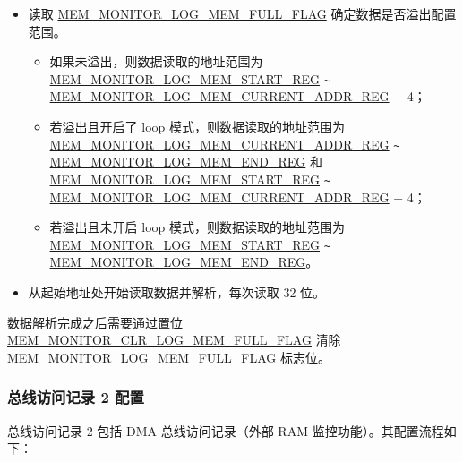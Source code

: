 \documentclass[main\_\_CN.tex]{subfiles}
\begin{document}
\begin{itemize}
    \item 读取 \hyperref[fielddesc:MEMMONITORLOGMEMFULLFLAG]{MEM\_MONITOR\_LOG\_MEM\_FULL\_FLAG} 确定数据是否溢出配置范围。
    \begin{itemize}
        \item 如果未溢出，则数据读取的地址范围为 \hyperref[regdesc:MEMMONITORLOGMEMSTARTREG]{MEM\_MONITOR\_LOG\_MEM\_START\_REG} \verb+~+ \hyperref[regdesc:MEMMONITORLOGMEMCURRENTADDRREG]{MEM\_MONITOR\_LOG\_MEM\_CURRENT\_ADDR\_REG} $-$ 4；
        \item 若溢出且开启了 loop 模式，则数据读取的地址范围为 \hyperref[regdesc:MEMMONITORLOGMEMCURRENTADDRREG]{MEM\_MONITOR\_LOG\_MEM\_CURRENT\_ADDR\_REG} \verb+~+ \hyperref[regdesc:MEMMONITORLOGMEMENDREG]{MEM\_MONITOR\_LOG\_MEM\_END\_REG} 和 \hyperref[regdesc:MEMMONITORLOGMEMSTARTREG]{MEM\_MONITOR\_LOG\_MEM\_START\_REG} \verb+~+ \hyperref[regdesc:MEMMONITORLOGMEMCURRENTADDRREG]{MEM\_MONITOR\_LOG\_MEM\_CURRENT\_ADDR\_REG} $-$ 4；
        \item 若溢出且未开启 loop 模式，则数据读取的地址范围为 \hyperref[regdesc:MEMMONITORLOGMEMSTARTREG]{MEM\_MONITOR\_LOG\_MEM\_START\_REG} \verb+~+ \hyperref[regdesc:MEMMONITORLOGMEMENDREG]{MEM\_MONITOR\_LOG\_MEM\_END\_REG}。
    \end{itemize}
    \item 从起始地址处开始读取数据并解析，每次读取 32 位。
\end{itemize}

数据解析完成之后需要通过置位 \hyperref[fielddesc:MEMMONITORCLRLOGMEMFULLFLAG]{MEM\_MONITOR\_CLR\_LOG\_MEM\_FULL\_FLAG} 清除 \hyperref[fielddesc:MEMMONITORLOGMEMFULLFLAG]{MEM\_MONITOR\_LOG\_MEM\_FULL\_FLAG} 标志位。

\subsubsection{总线访问记录 2 配置}

总线访问记录 2 包括 DMA 总线访问记录（外部 RAM 监控功能）。其配置流程如下：
\end{document}
